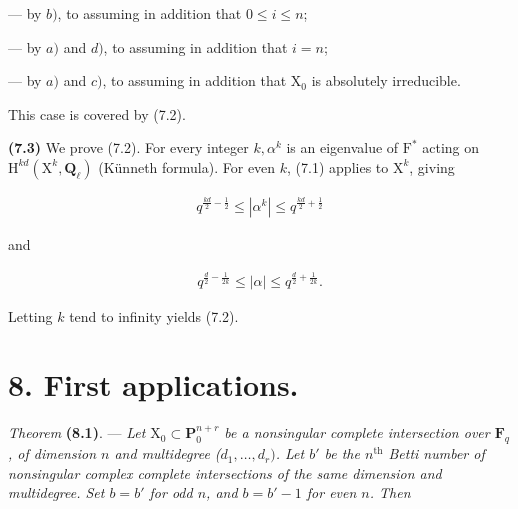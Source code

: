 \documentclass[10pt,leqno]{article}
\begin{document}
\noindent — by \(b)\), to assuming in addition that \(0\leq i\leq n\);\par

\noindent — by \(a)\) and \(d)\), to assuming in addition that \(i=n\);\par

\noindent — by \(a)\) and \(c)\), to assuming in addition that \(\mathrm{X}_{0}\) is absolutely irreducible.\par

\noindent This case is covered by (7.2).\par

\noindent \textbf{(7.3)} We prove (7.2). For every integer \(k, \alpha ^{k}\) is an eigenvalue of \(\mathrm{F}^{*}\) acting on \(\mathrm{H}^{kd}(\mathrm{X}^{k},\mathbf{Q}_{\ell })\) (Künneth formula). For even \(k\), (7.1) applies to \(\mathrm{X}^{k}\), giving\par

\begin{equation*}\begin{gathered}q^{\frac{kd}{2}- \frac{1}{2}} \leq  |\alpha ^{k}| \leq  q^{\frac{kd}{2}+\frac{1}{2}}\end{gathered}\end{equation*}

\noindent and\par

\begin{equation*}\begin{gathered}q^{\frac{d}{2}- \frac{1}{2k}} \leq  |\alpha | \leq  q^{\frac{d}{2}+\frac{1}{2k}}.\end{gathered}\end{equation*}

\noindent Letting \(k\) tend to infinity yields (7.2).\par

\section*{8. First applications.}

\noindent \emph{Theorem} \textbf{(8.1)}. — {\itshape Let \(\mathrm{X}_{0}\subset \mathbf{P}_{0}^{n+r}\) be a nonsingular complete intersection over \(\mathbf{F}_{q}\), of dimension \(n\) and multidegree (\(d_{1},\ldots ,d_{r})\). Let \(b'\) be the \(n^{\mathrm{th}}\) Betti number of nonsingular complex complete intersections of the same dimension and multidegree. Set \(b=b'\) for odd \(n\), and \(b=b'- 1\) for even \(n\). Then}\par
\end{document}
